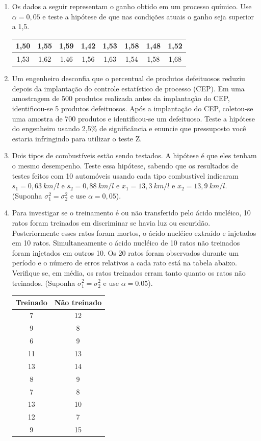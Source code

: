 \documentclass[12pt, a4paper]{article}
\begin{document}
\begin{enumerate}
\item Os dados a seguir representam o ganho obtido em um processo químico. Use $\alpha=0,05$ e teste a hipótese de que nas condições atuais o ganho seja superior a 1,5.
\begin{center}
\begin{tabular}{|c|c|c|c|c|c|c|c|}
\hline
1,50 & 1,55 & 1,59 & 1,42 & 1,53 & 1,58 & 1,48 & 1,52 \\
\hline
1,53 & 1,62 & 1,46 & 1,56 & 1,63 & 1,54 & 1,58 & 1,68 \\
\hline
\end{tabular}
\end{center}

\item Um engenheiro desconfia que o percentual de produtos defeituosos reduziu depois da implantação do controle estatístico de processo (CEP). Em uma amostragem de 500 produtos realizada antes da implantação do CEP, identificou-se 5 produtos defeituosos. Após a implantação do CEP, coletou-se uma amostra de 700 produtos e identificou-se um defeituoso. Teste a hipótese do engenheiro usando 2,5\% de significância e enuncie que pressuposto você estaria infringindo para utilizar o teste Z.

\item Dois tipos de combustíveis estão sendo testados. A hipótese é que eles tenham o mesmo desempenho. Teste essa hipótese, sabendo que os resultados de testes feitos com 10 automóveis usando cada tipo combustível indicaram $s_{1}=0,63~km/l$ e $s_{2}=0,88~km/l$ e $\overline{x}_{1}=13,3~km/l$ e $\overline{x}_{2}=13,9~km/l$. (Suponha $\sigma_{1}^{2}=\sigma_{2}^{2}$ e use $\alpha=0,05$).

\item Para investigar se o treinamento é ou não transferido pelo ácido nucléico, 10 ratos foram treinados em discriminar se havia luz ou escuridão. Posteriormente esses ratos foram mortos, o ácido nucléico extraído e injetados em 10 ratos. Simultaneamente o ácido nucléico de 10 ratos não treinados foram injetados em outros 10. Os 20 ratos foram observados durante um período e o número de erros relativos a cada rato está na tabela abaixo. Verifique se, em média, os ratos treinados erram tanto quanto os ratos não treinados. (Suponha $\sigma_{1}^{2}=\sigma_{2}^{2}$ e use $\alpha=0.05$).
\begin{center}
\begin{tabular}{|c|c|}
\hline
\textbf{Treinado} & \textbf{Não treinado} \\
\hline
7 & 12 \\
9 & 8 \\
6 & 9 \\
11 & 13 \\
13 & 14 \\
8 & 9 \\
7 & 8 \\
13 & 10 \\
12 & 7 \\
9 & 15 \\
\hline
\end{tabular}
\end{center}


\end{enumerate}
\end{document}
